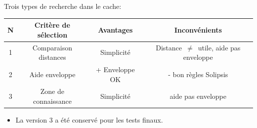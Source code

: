 \documentclass{beamer}
\begin{document}
  \begin{frame}
	Trois types de recherche dans le cache:
	\vspace{3mm}
	\tiny{
	\begin{table}
  		\begin{center}
    		 \begin{tabular}{|c|c|c|c|}
      		 \hline
      		 N & Critère de sélection & Avantages & Inconvénients\\
      		 \hline
        	 1 & Comparaison distances & Simplicité & Distance~$\ne$~utile, aide pas enveloppe\\
        	 2 & Aide enveloppe & + Enveloppe OK & - bon règles Solipsis\\
        	 3 & Zone de connaissance & Simplicité & aide pas enveloppe\\
      		 \hline
    		 \end{tabular}
  		\end{center}
	\end{table}
	}
	\begin{itemize}
		\item La version 3 a été conservé pour les tests finaux.

	\end{itemize}

  \end{frame}
 
  \begin{frame}
  \end{frame}
	
\end{document}
